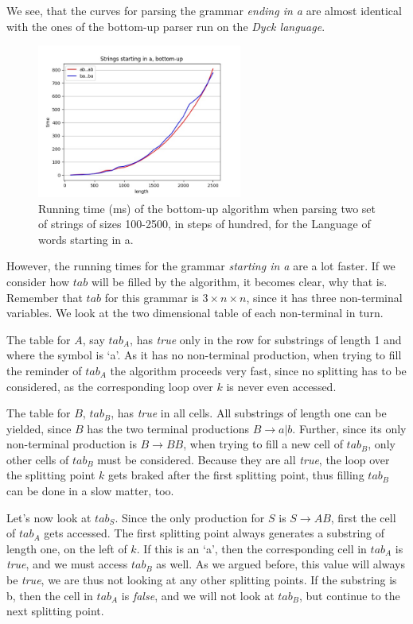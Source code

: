 We see, that the curves for parsing the grammar \textit{ending in a} are almost identical with the ones of the bottom-up parser run on the \textit{Dyck language}.

\begin{figure}[h!]
    \centering
    \includegraphics[width=0.6\textwidth]{Resources/t_sa_bu.jpg}
    \caption{Running time (ms) of the bottom-up algorithm when parsing two set of strings of sizes 100-2500, in steps of hundred, for the Language of words starting in a.}
    \label{fig:t_sa_bu}
\end{figure}

However, the running times for the grammar \textit{starting in a} are a lot faster.
If we consider how $tab$ will be filled by the algorithm, it becomes clear, why that is.
Remember that $tab$ for this grammar is $3\times n\times n$, since it has three non-terminal variables.
We look at the two dimensional table of each non-terminal in turn.

The table for $A$, say $tab_A$, has \textit{true} only in the row for substrings of length 1 and where the symbol is \lq a\rq.
As it has no non-terminal production, when trying to fill the reminder of $tab_A$ the algorithm proceeds very fast, since no splitting has to be considered, as the corresponding loop over $k$ is never even accessed.

The table for $B$, $tab_B$, has \textit{true} in all cells.
All substrings of length one can be yielded, since $B$ has the two terminal productions $B\rightarrow a|b$.
Further, since its only non-terminal production is $B\rightarrow BB$, when trying to fill a new cell of $tab_B$, only other cells of $tab_B$ must be considered.
Because they are all \textit{true}, the loop over the splitting point $k$ gets braked after the first splitting point, thus filling $tab_B$ can be done in a slow matter, too.

Let's now look at $tab_S$.
Since the only production for $S$ is $S\rightarrow AB$, first the cell of $tab_A$ gets accessed.
The first splitting point always generates a substring of length one, on the left of $k$.
If this is an \lq a\rq, then the corresponding cell in $tab_A$ is \textit{true}, and we must access $tab_B$ as well.
As we argued before, this value will always be \textit{true}, we are thus not looking at any other splitting points.
If the substring is b, then the cell in $tab_A$ is \textit{false}, and we will not look at $tab_B$, but continue to the next splitting point.

